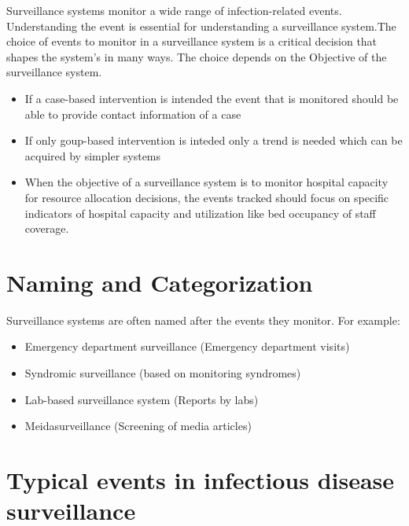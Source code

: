 \documentclass[
  letterpaper,
  DIV=11,
  numbers=noendperiod]{scrreprt}
\providecommand{\tightlist}{%
  \setlength{\itemsep}{0pt}\setlength{\parskip}{0pt}}\usepackage{longtable,booktabs,array}
\begin{document}
Surveillance systems monitor a wide range of infection-related events.
Understanding the event is essential for understanding a surveillance
system.The choice of events to monitor in a surveillance system is a
critical decision that shapes the system's in many ways. The choice
depends on the Objective of the surveillance system.

\begin{itemize}
\tightlist
\item
  If a case-based intervention is intended the event that is monitored
  should be able to provide contact information of a case
\item
  If only goup-based intervention is inteded only a trend is needed
  which can be acquired by simpler systems
\item
  When the objective of a surveillance system is to monitor hospital
  capacity for resource allocation decisions, the events tracked should
  focus on specific indicators of hospital capacity and utilization like
  bed occupancy of staff coverage.
\end{itemize}

\section{Naming and Categorization}\label{naming-and-categorization}

Surveillance systems are often named after the events they monitor. For
example:

\begin{itemize}
\tightlist
\item
  Emergency department surveillance (Emergency department visits)
\item
  Syndromic surveillance (based on monitoring syndromes)
\item
  Lab-based surveillance system (Reports by labs)
\item
  Meidasurveillance (Screening of media articles)
\end{itemize}

\section{Typical events in infectious disease
surveillance}\label{typical-events-in-infectious-disease-surveillance}
\end{document}
